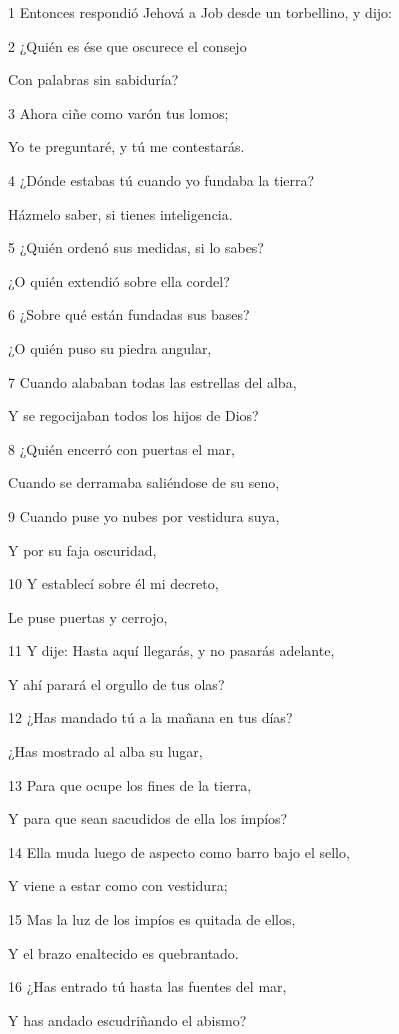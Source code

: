 \par 1 Entonces respondió Jehová a Job desde un torbellino, y dijo:
\par 2 ¿Quién es ése que oscurece el consejo
\par Con palabras sin sabiduría?
\par 3 Ahora ciñe como varón tus lomos;
\par Yo te preguntaré, y tú me contestarás.
\par 4 ¿Dónde estabas tú cuando yo fundaba la tierra?
\par Házmelo saber, si tienes inteligencia.
\par 5 ¿Quién ordenó sus medidas, si lo sabes?
\par ¿O quién extendió sobre ella cordel?
\par 6 ¿Sobre qué están fundadas sus bases?
\par ¿O quién puso su piedra angular,
\par 7 Cuando alababan todas las estrellas del alba,
\par Y se regocijaban todos los hijos de Dios?
\par 8 ¿Quién encerró con puertas el mar,
\par Cuando se derramaba saliéndose de su seno, 
\par 9 Cuando puse yo nubes por vestidura suya,
\par Y por su faja oscuridad,
\par 10 Y establecí sobre él mi decreto,
\par Le puse puertas y cerrojo,
\par 11 Y dije: Hasta aquí llegarás, y no pasarás adelante,
\par Y ahí parará el orgullo de tus olas? 
\par 12 ¿Has mandado tú a la mañana en tus días?
\par ¿Has mostrado al alba su lugar,
\par 13 Para que ocupe los fines de la tierra,
\par Y para que sean sacudidos de ella los impíos?
\par 14 Ella muda luego de aspecto como barro bajo el sello,
\par Y viene a estar como con vestidura;
\par 15 Mas la luz de los impíos es quitada de ellos,
\par Y el brazo enaltecido es quebrantado.
\par 16 ¿Has entrado tú hasta las fuentes del mar,
\par Y has andado escudriñando el abismo?
